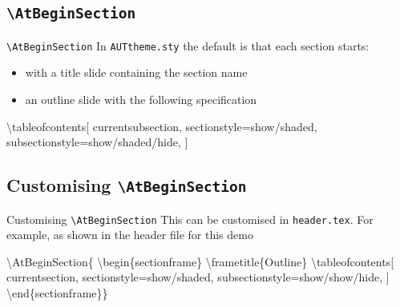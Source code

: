 \documentclass[
  ignorenonframetext,
  aspectratio=169]{beamer}
\newenvironment{Shaded}{\begin{snugshade}}{\end{snugshade}}
\newcommand{\NormalTok}[1]{#1}
\newcommand{\OtherTok}[1]{\textcolor[rgb]{0.56,0.35,0.01}{#1}}
\newcommand{\SpecialCharTok}[1]{\textcolor[rgb]{0.00,0.00,0.00}{#1}}
\providecommand{\tightlist}{%
  \setlength{\itemsep}{0pt}\setlength{\parskip}{0pt}}
\begin{document}
\hypertarget{atbeginsection}{%
\subsection{\texorpdfstring{\texttt{\textbackslash{}AtBeginSection}}{\textbackslash AtBeginSection}}\label{atbeginsection}}

\begin{frame}[fragile]{\texttt{\textbackslash{}AtBeginSection}}
In \texttt{AUTtheme.sty} the default is that each section starts:

\begin{itemize}
\tightlist
\item
  with a title slide containing the section name
\item
  an outline slide with the following specification
\end{itemize}

\begin{Shaded}
\begin{Highlighting}[]
\NormalTok{\textbackslash{}tableofcontents[}
\NormalTok{      currentsubsection,}
\NormalTok{      sectionstyle}\OtherTok{=}\NormalTok{show}\SpecialCharTok{/}\NormalTok{shaded,}
\NormalTok{      subsectionstyle}\OtherTok{=}\NormalTok{show}\SpecialCharTok{/}\NormalTok{shaded}\SpecialCharTok{/}\NormalTok{hide,}
\NormalTok{    ]}
\end{Highlighting}
\end{Shaded}
\end{frame}

\hypertarget{customising-atbeginsection}{%
\subsection{\texorpdfstring{Customising
\texttt{\textbackslash{}AtBeginSection}}{Customising \textbackslash AtBeginSection}}\label{customising-atbeginsection}}

\begin{frame}[fragile]{Customising
\texttt{\textbackslash{}AtBeginSection}}
This can be customised in \texttt{header.tex}. For example, as shown in
the header file for this demo

\begin{Shaded}
\begin{Highlighting}[]
\NormalTok{\textbackslash{}AtBeginSection\{}
\NormalTok{\textbackslash{}begin\{sectionframe\}}
\NormalTok{\textbackslash{}frametitle\{Outline\}}
\NormalTok{\textbackslash{}tableofcontents[}
\NormalTok{        currentsection,}
\NormalTok{        sectionstyle}\OtherTok{=}\NormalTok{show}\SpecialCharTok{/}\NormalTok{shaded,}
\NormalTok{        subsectionstyle}\OtherTok{=}\NormalTok{show}\SpecialCharTok{/}\NormalTok{show}\SpecialCharTok{/}\NormalTok{hide,}
\NormalTok{    ]}
\NormalTok{\textbackslash{}end\{sectionframe\}\}}
\end{Highlighting}
\end{Shaded}
\end{frame}
\end{document}

